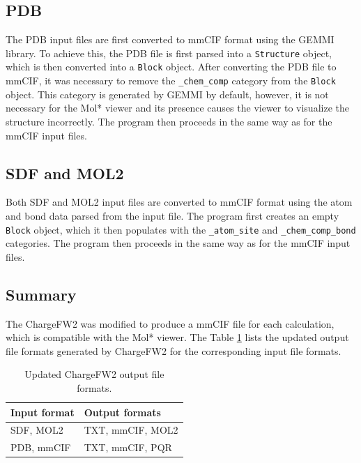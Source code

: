 \documentclass[
  digital,     %
  oneside,     %
  nosansbold,  %
  nocolorbold, %
  lof,         %
  lot,         %
]{fithesis4}
\begin{document}
\subsection*{PDB}

The PDB input files are first converted to mmCIF format using the GEMMI library. To achieve this, the PDB file is first parsed into a \texttt{Structure} object, which is then converted into a \texttt{Block} object. After converting the PDB file to mmCIF, it was necessary to remove the \texttt{\_chem\_comp} category from the \texttt{Block} object. This category is generated by GEMMI by default, however, it is not necessary for the Mol* viewer and its presence causes the viewer to visualize the structure incorrectly. The program then proceeds in the same way as for the mmCIF input files.

\subsection*{SDF and MOL2}

Both SDF and MOL2 input files are converted to mmCIF format using the atom and bond data parsed from the input file. The program first creates an empty \texttt{Block} object, which it then populates with the \texttt{\_atom\_site} and \texttt{\_chem\_comp\_bond} categories. The program then proceeds in the same way as for the mmCIF input files.

\subsection*{Summary}

The ChargeFW2 was modified to produce a mmCIF file for each calculation, which is compatible with the Mol* viewer. The Table \ref{table:new_chargefw2_output_formats} lists the updated output file formats generated by ChargeFW2 for the corresponding input file formats.

\begin{table}[htbp]
  \centering
  \begin{tabular}{|l|l|}
    \hline
    \textbf{Input format} & \textbf{Output formats} \\
    \hline
    SDF, MOL2 & TXT, mmCIF, MOL2 \\
    \hline
    PDB, mmCIF & TXT, mmCIF, PQR \\
    \hline
  \end{tabular}
  \caption{Updated ChargeFW2 output file formats.}
  \label{table:new_chargefw2_output_formats}
\end{table}
\end{document}
